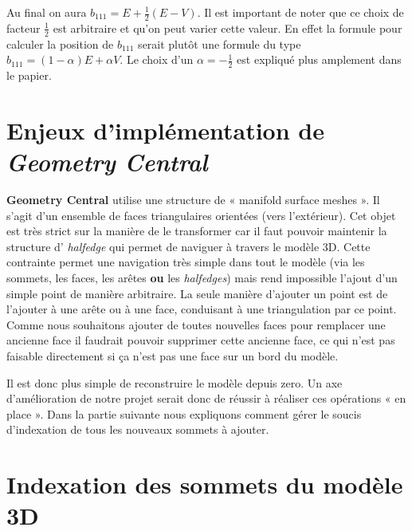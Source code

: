 \documentclass{article}
\begin{document}
Au final on aura $b_{111} = E + \frac{1}{2}(E-V)$. Il est important de noter
que ce choix de facteur $\frac{1}{2}$ est arbitraire et qu'on peut varier cette
valeur. En effet la formule pour calculer la position de $b_{111}$ serait
plutôt une formule du type $b_{111} = (1-\alpha)E + \alpha V$. Le choix d'un
$\alpha = -\frac{1}{2}$ est expliqué plus amplement dans le papier.


\section{Enjeux d'implémentation de \textit{Geometry Central}}

\textbf{Geometry Central} utilise une structure de « manifold surface meshes ».
Il s'agit d'un ensemble de faces triangulaires orientées (vers l'extérieur).
Cet objet est très strict sur la manière de le transformer car il faut pouvoir
maintenir la structure d' \textit{halfedge} qui permet de naviguer à travers le
modèle 3D. Cette contrainte permet une navigation très simple dans tout le
modèle (via les sommets, les faces, les arêtes \textbf{ou} les
\textit{halfedges}) mais rend impossible l'ajout d'un simple point de manière
arbitraire. La seule manière d'ajouter un point est de l'ajouter à une arête ou
à une face, conduisant à une triangulation par ce point. Comme nous souhaitons
ajouter de toutes nouvelles faces pour remplacer une ancienne face il faudrait
pouvoir supprimer cette ancienne face, ce qui n'est pas faisable directement si
ça n'est pas une face sur un bord du modèle.

Il est donc plus simple de reconstruire le modèle depuis zero. Un axe
d'amélioration de notre projet serait donc de réussir à réaliser ces opérations
« en place ». Dans la partie suivante nous expliquons comment gérer le soucis
d'indexation de tous les nouveaux sommets à ajouter.

\section{Indexation des sommets du modèle 3D}
\end{document}
